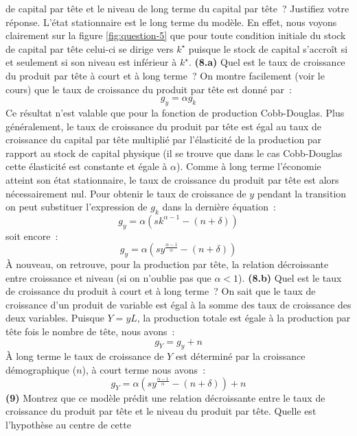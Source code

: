 \documentclass[10pt,a4paper,notitlepage]{article}
\newcommand{\question}[1]{\textbf{(#1)}}
\begin{document}
de capital par tête  et le niveau de long terme  du capital par tête ?
Justifiez votre réponse. {\color{red}  L'état stationnaire est le long
  terme du  modèle.  En  effet, nous voyons  clairement sur  la figure
  \ref{fig:question-5} que  pour toute condition initiale  du stock de
  capital  par tête  celui-ci se  dirige vers  $k^{\star}$ puisque  le
  stock  de  capital s'accroît  si  et  seulement  si son  niveau  est
  inférieur  à  $k^{\star}$.}   \question{8.a}  Quel est  le  taux  de
croissance du produit par tête à  court et à long terme ? {\color{red}
  On montre  facilement (voir le cours)  que le taux de  croissance du
  produit par tête est donné par :
\[
g_y = \alpha g_k
\]
Ce  résultat  n'est  valable  que   pour  la  fonction  de  production
Cobb-Douglas. Plus généralement, le taux  de croissance du produit par
tête est égal au taux de  croissance du capital par tête multiplié par
l'élasticité de la production par rapport au stock de capital physique
(il  se trouve  que  dans  le cas  Cobb-Douglas  cette élasticité  est
constante et égale à $\alpha$).  Comme à long terme l'économie atteint
son état stationnaire,  le taux de croissance du produit  par tête est
alors nécessairement  nul. Pour obtenir  le taux de croissance  de $y$
pendant la transition on peut substituer l'expression de $g_k$ dans la
dernière équation :
\[
g_y = \alpha \left(sk^{\alpha-1} - (n+\delta)\right)
\]
soit encore :
\[
g_y = \alpha \left(sy^{\frac{\alpha-1}{\alpha}} - (n+\delta)\right)
\]
À  nouveau, on  retrouve, pour  la  production par  tête, la  relation
décroissante  entre  croissance et  niveau  (si  on n'oublie  pas  que
$\alpha<1$).}   \question{8.b}  Quel  est  le taux  de  croissance  du
produit à court et à long terme ?  {\color{red} On sait que le taux de
  croissance d'un produit de variable est  égal à la somme des taux de
  croissance  des deux  variables. Puisque  $Y =  y L$,  la production
  totale est  égale à la production  par tête fois le  nombre de tête,
  nous avons :
\[
g_Y = g_y + n
\]
À  long terme  le  taux de  croissance  de $Y$  est  déterminé par  la
croissance démographique ($n$), à court terme nous avons :
\[
g_Y = \alpha \left(sy^{\frac{\alpha-1}{\alpha}} - (n+\delta)\right) + n
\]
}\question{9}
Montrez  que ce modèle prédit  une relation décroissante
entre  le taux  de croissance  du  produit par  tête et  le niveau  du
produit  par  tête.   Quelle  est   l'hypothèse  au  centre  de  cette
\end{document}
